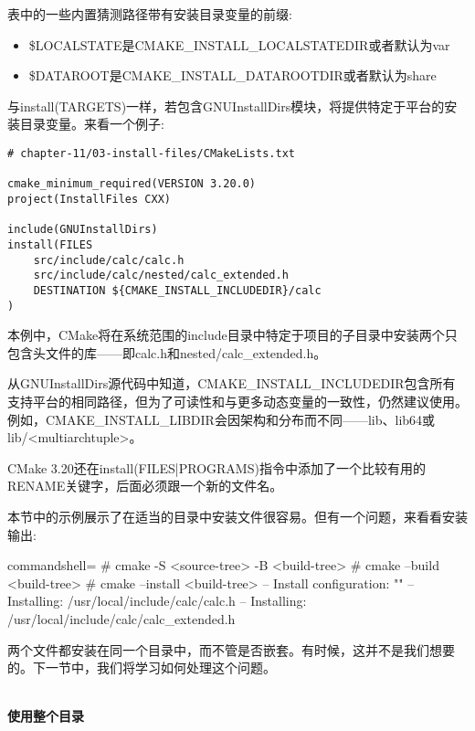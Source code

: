 表中的一些内置猜测路径带有安装目录变量的前缀:

\begin{itemize}
\item 
\$LOCALSTATE是CMAKE\_INSTALL\_LOCALSTATEDIR或者默认为var

\item 
\$DATAROOT是CMAKE\_INSTALL\_DATAROOTDIR或者默认为share
\end{itemize}

与install(TARGETS)一样，若包含GNUInstallDirs模块，将提供特定于平台的安装目录变量。来看一个例子:

\begin{lstlisting}[style=styleCMake]
# chapter-11/03-install-files/CMakeLists.txt

cmake_minimum_required(VERSION 3.20.0)
project(InstallFiles CXX)

include(GNUInstallDirs)
install(FILES
	src/include/calc/calc.h
	src/include/calc/nested/calc_extended.h
	DESTINATION ${CMAKE_INSTALL_INCLUDEDIR}/calc
)
\end{lstlisting}

本例中，CMake将在系统范围的include目录中特定于项目的子目录中安装两个只包含头文件的库——即calc.h和nested/calc\_extended.h。

\begin{tcolorbox}[colback=blue!5!white,colframe=blue!75!black,title=Note]
从GNUInstallDirs源代码中知道，CMAKE\_INSTALL\_INCLUDEDIR包含所有支持平台的相同路径，但为了可读性和与更多动态变量的一致性，仍然建议使用。例如，CMAKE\_INSTALL\_LIBDIR会因架构和分布而不同——lib、lib64或lib/<multiarchtuple>。
\end{tcolorbox}

CMake 3.20还在install(FILES|PROGRAMS)指令中添加了一个比较有用的RENAME关键字，后面必须跟一个新的文件名。

本节中的示例展示了在适当的目录中安装文件很容易。但有一个问题，来看看安装输出:

\begin{tcblisting}{commandshell={}}
# cmake -S <source-tree> -B <build-tree>
# cmake --build <build-tree>
# cmake --install <build-tree>
-- Install configuration: ""
-- Installing: /usr/local/include/calc/calc.h
-- Installing: /usr/local/include/calc/calc_extended.h
\end{tcblisting}

两个文件都安装在同一个目录中，而不管是否嵌套。有时候，这并不是我们想要的。下一节中，我们将学习如何处理这个问题。


\hspace*{\fill} \\ %
\noindent
\textbf{使用整个目录}

